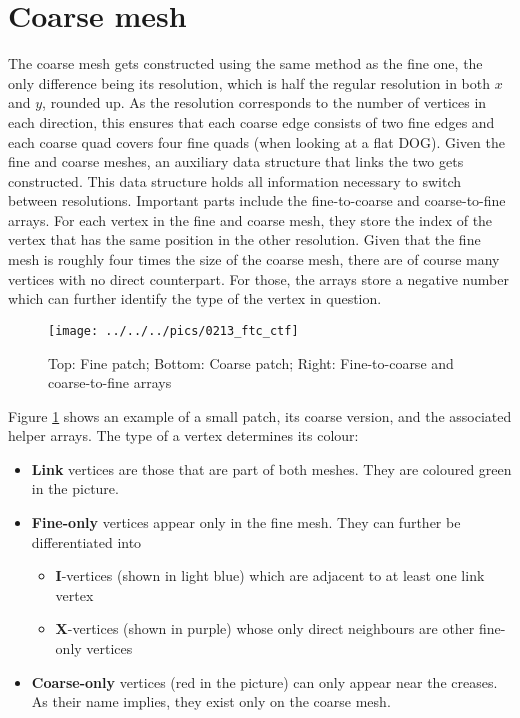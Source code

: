\documentclass[a4paper,twoside,12pt,nochapterprefix]{scrbook}
\begin{document}
\section{Coarse mesh}\label{sec:coarse_construction}
The coarse mesh gets constructed using the same method as the fine one, the only difference being its resolution, which is half the regular resolution in both $x$ and $y$, rounded up. As the resolution corresponds to the number of vertices in each direction, this ensures that each coarse edge consists of two fine edges and each coarse quad covers four fine quads (when looking at a flat DOG).\newline
Given the fine and coarse meshes, an auxiliary data structure that links the two gets constructed. This data structure holds all information necessary to switch between resolutions. Important parts include the fine-to-coarse and coarse-to-fine arrays. For each vertex in the fine and coarse mesh, they store the index of the vertex that has the same position in the other resolution. Given that the fine mesh is roughly four times the size of the coarse mesh, there are of course many vertices with no direct counterpart. For those, the arrays store a negative number which can further identify the type of the vertex in question.\newline
\begin{figure}
    \centering
    \texttt{[image: ../../../pics/0213\_ftc\_ctf]}
    \caption{Top: Fine patch; Bottom: Coarse patch; Right: Fine-to-coarse and coarse-to-fine arrays
      \label{fig:ftc_ctf}}
\end{figure}
Figure \ref{fig:ftc_ctf} shows an example of a small patch, its coarse version, and the associated helper arrays. The type of a vertex determines its colour:\newline
\begin{itemize}
\item \textbf{Link} vertices are those that are part of both meshes. They are coloured green in the picture.
\item \textbf{Fine-only} vertices appear only in the fine mesh. They can further be differentiated into
\begin{itemize}
\item \textbf{I}-vertices (shown in light blue) which are adjacent to at least one link vertex
\item \textbf{X}-vertices (shown in purple) whose only direct neighbours are other fine-only vertices
\end{itemize}
\item \textbf{Coarse-only} vertices (red in the picture) can only appear near the creases. As their name implies, they exist only on the coarse mesh.
\end{itemize}
\end{document}
